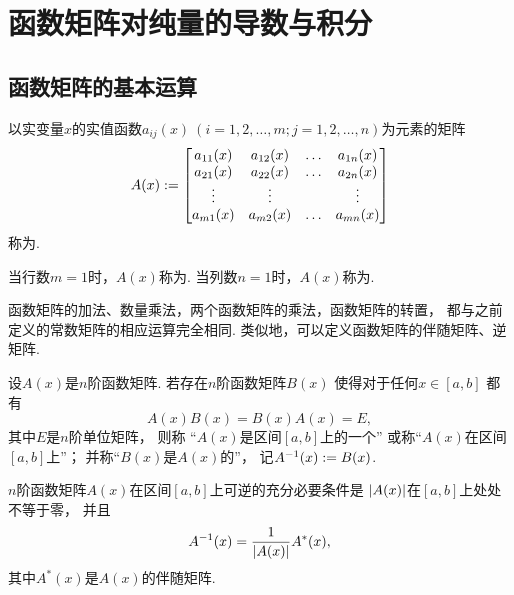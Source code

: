 \section{函数矩阵对纯量的导数与积分}
\subsection{函数矩阵的基本运算}
以实变量\(x\)的实值函数\(a_{ij}(x)\ (i=1,2,\dotsc,m;j=1,2,\dotsc,n)\)为元素的矩阵\begin{equation*}
	A(x)
	:=
	\begin{bmatrix}
		a_{11}(x) & a_{12}(x) & \dots & a_{1n}(x) \\
		a_{21}(x) & a_{22}(x) & \dots & a_{2n}(x) \\
		\vdots & \vdots & & \vdots \\
		a_{m1}(x) & a_{m2}(x) & \dots & a_{mn}(x) \\
	\end{bmatrix}
\end{equation*}
称为.

当行数\(m=1\)时，\(A(x)\)称为.
当列数\(n=1\)时，\(A(x)\)称为.

函数矩阵的加法、数量乘法，两个函数矩阵的乘法，函数矩阵的转置，
都与之前定义的常数矩阵的相应运算完全相同.
类似地，可以定义函数矩阵的伴随矩阵、逆矩阵.
\begin{definition}
设\(A(x)\)是\(n\)阶函数矩阵.
若存在\(n\)阶函数矩阵\(B(x)\)
使得对于任何\(x \in [a,b]\)
都有\begin{equation*}
	A(x) B(x) = B(x) A(x) = E,
\end{equation*}
其中\(E\)是\(n\)阶单位矩阵，
则称
“\(A(x)\)是区间\([a,b]\)上的一个”
或称“\(A(x)\)在区间\([a,b]\)上”；
并称“\(B(x)\)是\(A(x)\)的”，
记\(A^{-1}(x) := B(x)\).
\end{definition}

\begin{theorem}
\(n\)阶函数矩阵\(A(x)\)在区间\([a,b]\)上可逆的充分必要条件是
\(\abs{A(x)}\)在\([a,b]\)上处处不等于零，
并且\begin{equation*}
	A^{-1}(x)
	= \frac{1}{\abs{A(x)}}
	A^*(x),
\end{equation*}
其中\(A^*(x)\)是\(A(x)\)的伴随矩阵.
\end{theorem}

